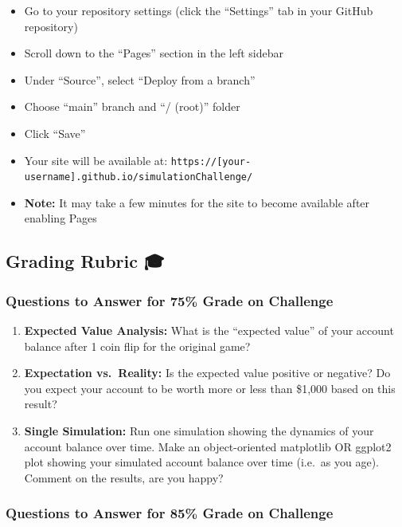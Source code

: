 \documentclass[
  letterpaper,
  DIV=11,
  numbers=noendperiod]{scrartcl}
\providecommand{\tightlist}{%
  \setlength{\itemsep}{0pt}\setlength{\parskip}{0pt}}
\theoremstyle{definition}
\theoremstyle{remark}
\begin{document}
\begin{enumerate}
  \begin{itemize}
  \tightlist
  \item
    Go to your repository settings (click the ``Settings'' tab in your
    GitHub repository)
  \item
    Scroll down to the ``Pages'' section in the left sidebar
  \item
    Under ``Source'', select ``Deploy from a branch''
  \item
    Choose ``main'' branch and ``/ (root)'' folder
  \item
    Click ``Save''
  \item
    Your site will be available at:
    \texttt{https://{[}your-username{]}.github.io/simulationChallenge/}
  \item
    \textbf{Note:} It may take a few minutes for the site to become
    available after enabling Pages
  \end{itemize}
\end{enumerate}

\subsection{Grading Rubric 🎓}\label{grading-rubric}

\subsubsection{Questions to Answer for 75\% Grade on
Challenge}\label{questions-to-answer-for-75-grade-on-challenge}

\begin{enumerate}
\def\labelenumi{\arabic{enumi}.}
\item
  \textbf{Expected Value Analysis:} What is the ``expected value'' of
  your account balance after 1 coin flip for the original game?
\item
  \textbf{Expectation vs.~Reality:} Is the expected value positive or
  negative? Do you expect your account to be worth more or less than
  \$1,000 based on this result?
\item
  \textbf{Single Simulation:} Run one simulation showing the dynamics of
  your account balance over time. Make an object-oriented matplotlib OR
  ggplot2 plot showing your simulated account balance over time (i.e.~as
  you age). Comment on the results, are you happy?
\end{enumerate}

\subsubsection{Questions to Answer for 85\% Grade on
Challenge}\label{questions-to-answer-for-85-grade-on-challenge}
\end{document}
